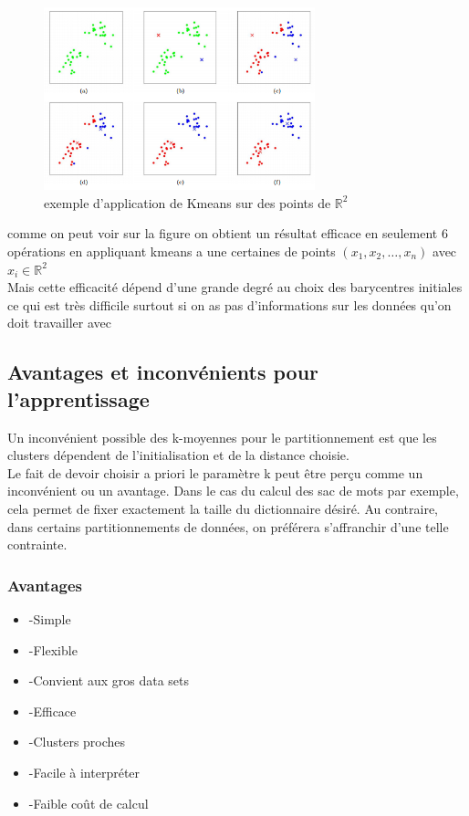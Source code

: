 \documentclass[a4paper,12pt]{report}
\begin{document}
\begin{figure}[ht]
    \centering
    \includegraphics[width=0.7\textwidth]{convergence.png}
    \caption{exemple d'application de Kmeans sur des points de $\mathbb{R}^2$}
    \label{fig:convergence}
\end{figure}

comme on peut voir sur la figure on obtient un résultat efficace en seulement 6 opérations en appliquant kmeans a une certaines de points $(x_1,x_2,…,x_n)$ avec $x_i\in \mathbb{R}^2$ \\Mais cette efficacité dépend d'une grande degré au choix des barycentres initiales ce qui est très difficile surtout si on as pas d'informations sur les données qu'on doit travailler avec


\subsection{Avantages et inconvénients pour l'apprentissage}
Un inconvénient possible des k-moyennes pour le partitionnement est que les clusters dépendent de l'initialisation et de la distance choisie.\\

Le fait de devoir choisir a priori le paramètre k peut être perçu comme un inconvénient ou un avantage. Dans le cas du calcul des sac de mots par exemple, cela permet de fixer exactement la taille du dictionnaire désiré. Au contraire, dans certains partitionnements de données, on préférera s'affranchir d'une telle contrainte.

\subsubsection{Avantages}

\begin{itemize}
    \item -Simple
    \item -Flexible
    \item -Convient aux gros data sets
    \item -Efficace
    \item -Clusters proches
    \item -Facile à interpréter
    \item -Faible coût de calcul
\end{itemize}
\end{document}

